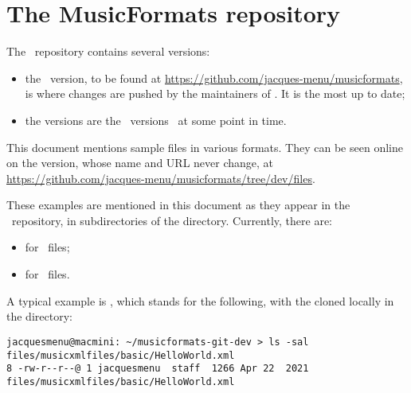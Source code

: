 



\chapter{The MusicFormats repository}

The \mf\ repository contains several versions:
\begin{itemize}
\item the  \master\ version, to be found at \url{https://github.com/jacques-menu/musicformats}, is where changes are pushed by the maintainers of \mf. It is the most up to date;
\item the  versions are the \master\ versions \frozen\ at some point in time.
\end{itemize}

This document mentions sample files in various formats. They can be seen online on the  version, whose name and URL never change, at \url{https://github.com/jacques-menu/musicformats/tree/dev/files}.

These examples are mentioned in this document as they appear in the \mf\ repository, in subdirectories of the  directory. Currently, there are:
\begin{itemize}
\item {} for \mxml\ files;
\item {} for \msdlLang\ files.
\end{itemize}

A typical example is , which stands for the following, with the  cloned locally in the  directory:
\begin{lstlisting}[language=Terminal]
jacquesmenu@macmini: ~/musicformats-git-dev > ls -sal files/musicxmlfiles/basic/HelloWorld.xml
8 -rw-r--r--@ 1 jacquesmenu  staff  1266 Apr 22  2021 files/musicxmlfiles/basic/HelloWorld.xml
\end{lstlisting}

